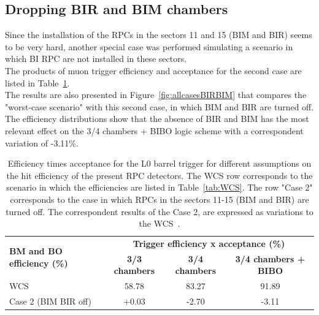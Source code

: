 \FloatBarrier
\subsection{Dropping BIR and BIM chambers}
\label{sec:BIRBIM_drop}
Since the installation of the RPCs in the sectors 11 and 15 (BIM and BIR) seems to be very hard, another special case was performed simulating a scenario in which BI RPC are not installed in these sectors.\\
The products of muon trigger efficiency and acceptance for the second case are listed in Table~\ref{tab:allcasesBIRBIM}.\\
The results are also presented in Figure~\ref{fig:allcasesBIRBIM} that compares the "worst-case scenario" with this second case, in which BIM and BIR are turned off.
The efficiency distributions show that the absence of BIR and BIM has the most relevant effect on the 3/4 chambers + BIBO logic scheme with a correspondent variation of -3.11\%.

\begin{table}[h]
	\begin{center}
		\small
		\begin{tabular}{l|c|c|c}
			\hline
			\multirow{2}{*}{\textbf{BM and BO efficiency (\%)}} & \multicolumn{3}{c}{\textbf{Trigger efficiency x acceptance (\%)}}\\
			\cline{2-4}   
			& \textbf{3/3 chambers} & \textbf{3/4 chambers} & \textbf{3/4 chambers + BIBO}\\
			\hline 
			WCS 												& 58.78 				& 83.27 				& 91.89\\
			Case 2  (BIM BIR off)								& +0.03 			   	& -2.70 				& -3.11\\
			\hline 
		\end{tabular} 
		\caption{Efficiency times acceptance for the L0 barrel trigger for different assumptions on the hit efficiency of the present RPC detectors. The WCS row corresponds to the scenario in which the efficiencies are listed in Table~\ref{tab:WCS}. The row "Case 2" corresponds to the case in which RPCs in the sectors 11-15 (BIM and BIR) are turned off. The correspondent results of the Case 2, are expressed as variations to the WCS~\cite{Marcoccia:2693982}.} 
		\label{tab:allcasesBIRBIM}
	\end{center} 
\end{table} 

